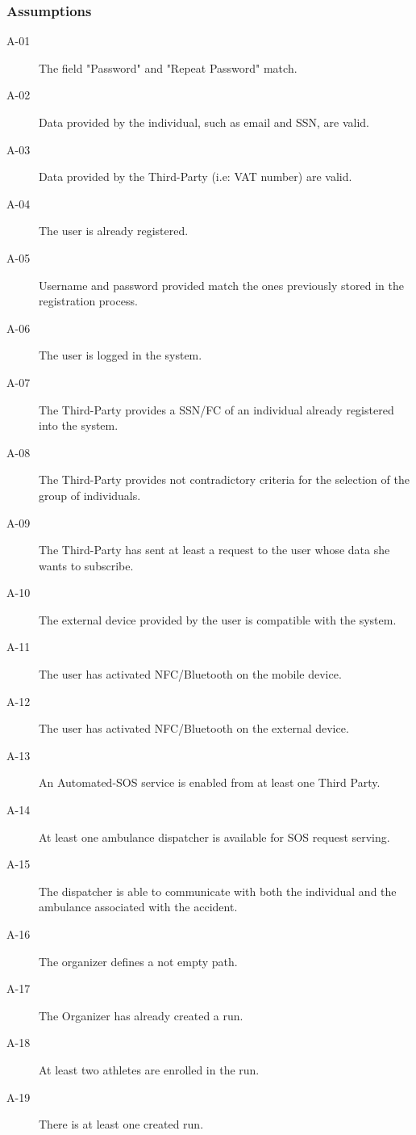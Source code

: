 \documentclass[a4paper]{article}
\begin{document}
        \subsubsection{Assumptions}
        \begin{description}
        \item[A-01] The field "Password" and "Repeat Password" match.
        \item[A-02] Data provided by the individual, such as email and SSN, are valid.
        \item[A-03] Data provided by the Third-Party (i.e: VAT number) are valid.
        \item[A-04] The user is already registered.
        \item[A-05] Username and password provided match the ones previously stored in the registration process.
        \item[A-06] The user is logged in the system.
        \item[A-07] The Third-Party provides a SSN/FC of an individual already registered into the system.
        \item[A-08] The Third-Party provides not contradictory criteria for the selection of the group of individuals.
        \item[A-09] The Third-Party has sent at least a request to the user whose data she wants to subscribe.
        \item[A-10] The external device provided by the user is compatible with the system.
        \item[A-11] The user has activated NFC/Bluetooth on the mobile device.
        \item[A-12] The user has activated NFC/Bluetooth on the external device.
        \item[A-13] An Automated-SOS service is enabled from at least one Third Party.
        \item[A-14] At least one ambulance dispatcher is available for SOS request serving.
        \item[A-15] The dispatcher is able to communicate with both the individual and the ambulance associated with the accident.
        \item[A-16] The organizer defines a not empty path.
        \item[A-17] The Organizer has already created a run.
        \item[A-18] At least two athletes are enrolled in the run.
        \item[A-19] There is at least one created run.

\end{description}
\end{document}
